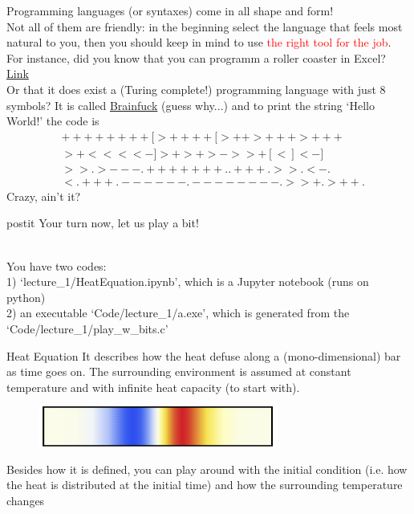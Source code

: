 \documentclass[10pt]{beamer}
\newcommand{\red}[1]{\textcolor{red}{#1}}
\renewcommand{\[}{\begin{equation*}}
\renewcommand{\]}{\end{equation*}}
\begin{document}
\begin{frame}
Programming languages (or syntaxes) come in all shape and form!\\
Not all of them are friendly: in the beginning select the language that feels most natural to you, then you should keep in mind to use \red{the right tool for the job}.\\
For instance, did you know that you can programm a roller coaster in Excel? \href{https://www.youtube.com/watch?v=IrVA1BBHFHw}{Link}\\
Or that it does exist a (Turing complete!) programming language with just 8 symbols? It is called \href{https://en.wikipedia.org/wiki/Brainfuck}{Brainfuck} (guess why...) and to print the string `Hello World!' the code is 
\[\begin{split}
& ++++++++[>++++[>++>+++>+++\\
& >+<<<<-]>+>+>->>+[<]<-]\\
& >>.>---.+++++++..+++.>>.<-.\\
& <.+++.------.--------.>>+.>++.
\end{split}\]
Crazy, ain't it?
\end{frame}

\begin{frame}
\begin{center}
\begin{minipage}{10cm}
\begin{beamercolorbox}[sep=1em,wd=6cm,rounded=true,shadow=true]{postit}
Your turn now, let us play a bit!
\end{beamercolorbox}\end{minipage}
\end{center}
$ $\\
You have two codes: \\
1) `lecture\_1/HeatEquation.ipynb', which is a Jupyter notebook (runs on python)\\
2) an executable `Code/lecture\_1/a.exe', which is generated from the `Code/lecture\_1/play\_w\_bits.c'
\end{frame}

\begin{frame}{Heat Equation}
It describes how the heat defuse along a (mono-dimensional) bar as time goes on. The surrounding environment is assumed at constant temperature and with infinite heat capacity (to start with).
\begin{center}
\begin{figure}
    \includegraphics[width=0.7\textwidth]{Notes/Figures/heat_bar.pdf}
\end{figure}
\end{center}

Besides how it is defined, you can play around with the initial condition (i.e. how the heat is distributed at the initial time) and how the surrounding temperature changes 

\end{frame}
\end{document}
